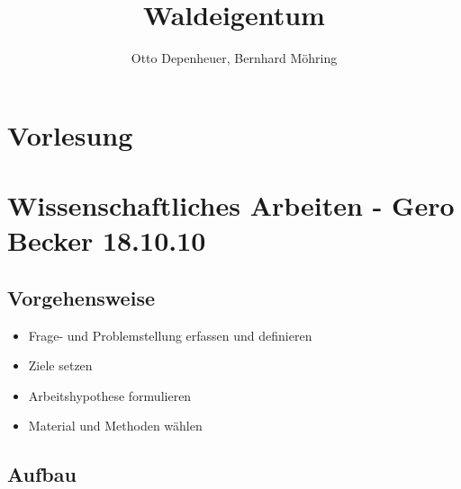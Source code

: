 \documentclass{article}
\begin{document}
\begin{titlepage}
\author{Otto Depenheuer, Bernhard Möhring} 
\title{Waldeigentum} 
\maketitle
\newpage
\tableofcontents
\end{titlepage} 

\section{Vorlesung}

\section{Wissenschaftliches Arbeiten - Gero Becker 18.10.10}
\subsection*{Vorgehensweise}
\begin{itemize}
  \item Frage- und Problemstellung erfassen und definieren
  \item Ziele setzen
  \item Arbeitshypothese formulieren
  \item Material und Methoden wählen
\end{itemize}
\subsection*{Aufbau}
\end{document}
